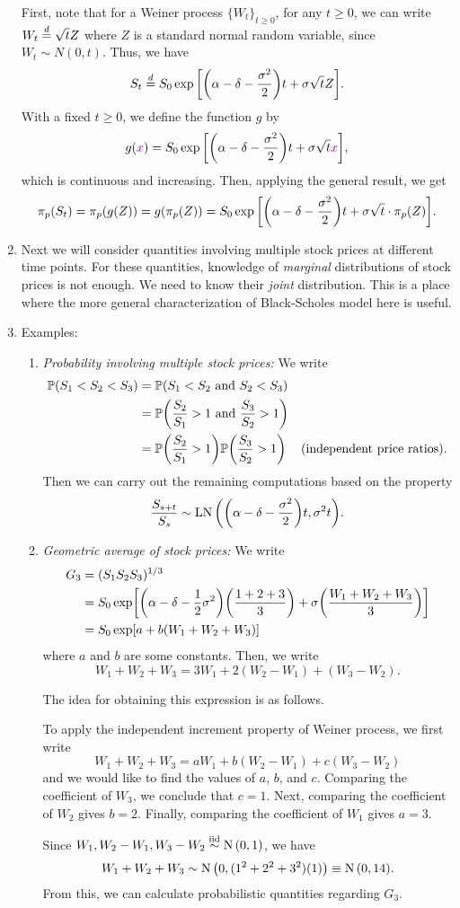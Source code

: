 \begin{enumerate}
\begin{pf}
First, note that for a Weiner process \(\{W_t\}_{t\ge 0}\), for any \(t\ge 0\),
we can write \(W_t\overset{d}=\sqrt{t}Z\) where \(Z\) is a standard normal random
variable, since \(W_t\sim N(0,t)\). Thus, we have
\[
S_t\overset{d}= S_0\exp\qty[\qty(\alpha-\delta-\frac{\sigma^2}{2})t+\sigma\sqrt{t}Z].
\]
With a fixed \(t\ge 0\), we define the function \(g\) by
\[
g({\color{violet}x})=S_0\exp\qty[\qty(\alpha-\delta-\frac{\sigma^2}{2})t+\sigma\sqrt{t}{\color{violet}x}],
\]
which is continuous and increasing. Then, applying the general result, we get
\[
\pi_p(S_t)=\pi_p(g(Z))=g(\pi_p(Z))=S_0\exp\qty[\qty(\alpha-\delta-\frac{\sigma^2}{2})t + \sigma\sqrt{t}\cdot \pi_{p}(Z)].
\]
\end{pf}
\item Next we will consider quantities involving multiple stock prices at
different time points. For these quantities, knowledge of \emph{marginal}
distributions of stock prices is not enough. We need to know their \emph{joint}
distribution. This is a place where the more general characterization of
Black-Scholes model here is useful.

\item Examples:
\begin{enumerate}
\item \emph{Probability involving multiple stock prices:} We write
\begin{align*}
\mathbb{P}\qty(S_1<S_2<S_3)
&=\mathbb{P}\qty(S_1<S_2\text{ and }S_2<S_3) \\
&=\mathbb{P}\qty(\frac{S_2}{S_1}>1\text{ and }\frac{S_3}{S_2}>1) \\
&=\mathbb{P}\qty(\frac{S_2}{S_1}>1)\mathbb{P}\qty(\frac{S_3}{S_2}>1)&\text{(independent price ratios)}.
\end{align*}
Then we can carry out the remaining computations based on the property
\[
\frac{S_{s+t}}{S_s}\sim \operatorname{LN}\qty(\qty(\alpha-\delta-\frac{\sigma^2}{2})t,\sigma^{2}t).
\]
\item \emph{Geometric average of stock prices:} We write
\begin{align*}
G_3&=(S_1S_2S_3)^{1/3}\\
&=S_0\exp[\qty(\alpha-\delta-\frac{1}{2}\sigma^2)\qty(\frac{1+2+3}{3})+\sigma\qty(\frac{W_1+W_2+W_3}{3})] \\
&=S_0\exp[a+b(W_1+W_2+W_3)]
\end{align*}
where \(a\) and \(b\) are some constants. Then, we write
\[
W_1+W_2+W_3=3W_1+2(W_2-W_1)+(W_3-W_2).
\]
\begin{note}
The idea for obtaining this expression is as follows.

To apply the independent increment property of Weiner process, we first write
\[
W_1+W_2+W_3=aW_1+b(W_2-W_1)+c(W_3-W_2)
\]
and we would like to find the values of \(a\), \(b\), and \(c\). Comparing the
coefficient of \(W_3\), we conclude that \(c=1\). Next, comparing the
coefficient of \(W_2\) gives \(b=2\). Finally, comparing the coefficient of
\(W_1\) gives \(a=3\).
\end{note}

Since \(W_1,W_2-W_1,W_3-W_2\overset{\mathrm{iid}}{\sim}\operatorname{N}\qty(0,1)\), we have
\[
W_1+W_2+W_3\sim\operatorname{N}\qty(0,(1^{2}+2^{2}+3^{2})(1))\equiv\operatorname{N}\qty(0,14).
\]
From this, we can calculate probabilistic quantities regarding \(G_3\).
\end{enumerate}
\end{enumerate}
